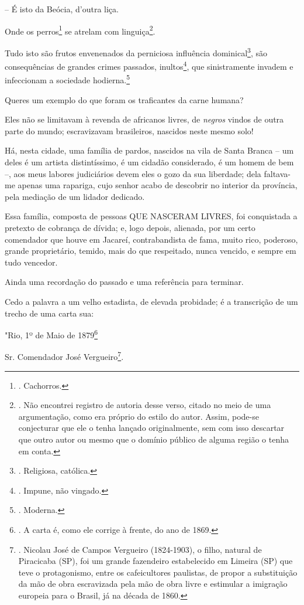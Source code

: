 -- É isto da Beócia, d'outra liça.

Onde os perros\footnote{. Cachorros.} se atrelam com linguiça\footnote{.
  Não encontrei registro de autoria desse verso, citado no meio de uma
  argumentação, como era próprio do estilo do autor. Assim, pode-se
  conjecturar que ele o tenha lançado originalmente, sem com isso
  descartar que outro autor ou mesmo que o domínio público de alguma
  região o tenha em conta.}.

Tudo isto são frutos envenenados da perniciosa influência
dominical\footnote{. Religiosa, católica.}, são consequências de grandes
crimes passados, inultos\footnote{. Impune, não vingado.}, que
sinistramente invadem e infeccionam a sociedade hodierna.\footnote{.
  Moderna.}

Queres um exemplo do que foram os traficantes da carne humana?

Eles não se limitavam à revenda de africanos livres, de \emph{negros}
vindos de outra parte do mundo; escravizavam brasileiros, nascidos neste
mesmo solo!

Há, nesta cidade, uma família de pardos, nascidos na vila de Santa
Branca -- um deles é um artista distintíssimo, é um cidadão considerado,
é um homem de bem --, aos meus labores judiciários devem eles o gozo da
sua liberdade; dela faltava-me apenas uma rapariga, cujo senhor acabo de
descobrir no interior da província, pela mediação de um lidador
dedicado.

Essa família, composta de pessoas QUE NASCERAM LIVRES, foi conquistada a
pretexto de cobrança de dívida; e, logo depois, alienada, por um certo
comendador que houve em Jacareí, contrabandista de fama, muito rico,
poderoso, grande proprietário, temido, mais do que respeitado, nunca
vencido, e sempre em tudo vencedor.

Ainda uma recordação do passado e uma referência para terminar.

Cedo a palavra a um velho estadista, de elevada probidade; é a
transcrição de um trecho de uma carta sua:

"Rio, 1º de Maio de 1879\footnote{. A carta é, como ele corrige à
  frente, do ano de 1869.}

Sr. Comendador José Vergueiro\footnote{. Nicolau José de Campos
  Vergueiro (1824-1903), o filho, natural de Piracicaba (SP), foi um
  grande fazendeiro estabelecido em Limeira (SP) que teve o
  protagonismo, entre os cafeicultores paulistas, de propor a
  substituição da mão de obra escravizada pela mão de obra livre e
  estimular a imigração europeia para o Brasil, já na década de 1860.}.

